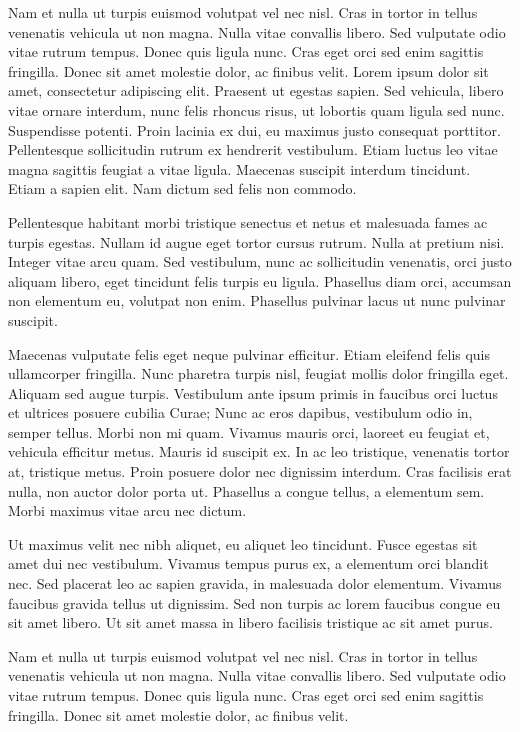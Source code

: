\documentclass[runningheads,a4paper]{llncs}
\begin{document}
Nam et nulla ut turpis euismod volutpat vel nec nisl. Cras in tortor in tellus venenatis vehicula ut non magna. Nulla vitae convallis libero. Sed vulputate odio vitae rutrum tempus. Donec quis ligula nunc. Cras eget orci sed enim sagittis fringilla. Donec sit amet molestie dolor, ac finibus velit.
%
\newpage
%
Lorem ipsum dolor sit amet, consectetur adipiscing elit. Praesent ut egestas sapien. Sed vehicula, libero vitae ornare interdum, nunc felis rhoncus risus, ut lobortis quam ligula sed nunc. Suspendisse potenti. Proin lacinia ex dui, eu maximus justo consequat porttitor. Pellentesque sollicitudin rutrum ex hendrerit vestibulum. Etiam luctus leo vitae magna sagittis feugiat a vitae ligula. Maecenas suscipit interdum tincidunt. Etiam a sapien elit. Nam dictum sed felis non commodo.

Pellentesque habitant morbi tristique senectus et netus et malesuada fames ac turpis egestas. Nullam id augue eget tortor cursus rutrum. Nulla at pretium nisi. Integer vitae arcu quam. Sed vestibulum, nunc ac sollicitudin venenatis, orci justo aliquam libero, eget tincidunt felis turpis eu ligula. Phasellus diam orci, accumsan non elementum eu, volutpat non enim. Phasellus pulvinar lacus ut nunc pulvinar suscipit.

Maecenas vulputate felis eget neque pulvinar efficitur. Etiam eleifend felis quis ullamcorper fringilla. Nunc pharetra turpis nisl, feugiat mollis dolor fringilla eget. Aliquam sed augue turpis. Vestibulum ante ipsum primis in faucibus orci luctus et ultrices posuere cubilia Curae; Nunc ac eros dapibus, vestibulum odio in, semper tellus. Morbi non mi quam. Vivamus mauris orci, laoreet eu feugiat et, vehicula efficitur metus. Mauris id suscipit ex. In ac leo tristique, venenatis tortor at, tristique metus. Proin posuere dolor nec dignissim interdum. Cras facilisis erat nulla, non auctor dolor porta ut. Phasellus a congue tellus, a elementum sem. Morbi maximus vitae arcu nec dictum.

Ut maximus velit nec nibh aliquet, eu aliquet leo tincidunt. Fusce egestas sit amet dui nec vestibulum. Vivamus tempus purus ex, a elementum orci blandit nec. Sed placerat leo ac sapien gravida, in malesuada dolor elementum. Vivamus faucibus gravida tellus ut dignissim. Sed non turpis ac lorem faucibus congue eu sit amet libero. Ut sit amet massa in libero facilisis tristique ac sit amet purus.

Nam et nulla ut turpis euismod volutpat vel nec nisl. Cras in tortor in tellus venenatis vehicula ut non magna. Nulla vitae convallis libero. Sed vulputate odio vitae rutrum tempus. Donec quis ligula nunc. Cras eget orci sed enim sagittis fringilla. Donec sit amet molestie dolor, ac finibus velit.
%
\newpage
%
\end{document}

